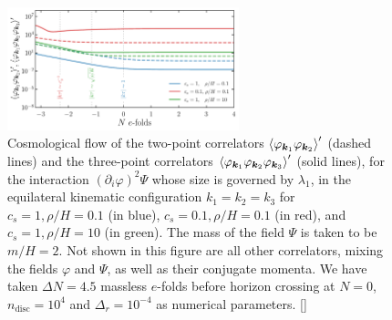\documentclass[11pt]{article}
\numberwithin{equation}{section} %
\begin{document}
\begin{figure}[h!]
  \centering
  \includegraphics[width=0.6\textwidth]{Figures/PhiPsi_DifferentHorizons.pdf}
  \vspace*{0.2cm}
  \caption{Cosmological flow of the two-point correlators $\braket{\varphi_{\bm{k}_1} \varphi_{\bm{k}_2}}'$ (dashed lines) and the three-point correlators $\braket{\varphi_{\bm{k}_1} \varphi_{\bm{k}_2} \varphi_{\bm{k}_3}}'$ (solid lines), for the interaction $(\partial_i \varphi)^2\Psi$ whose size is governed by $\lambda_1$, in the equilateral kinematic configuration $k_1=k_2=k_3$ for $c_s=1, \rho/H=0.1$ (in \textcolor{pyblue}{blue}), $c_s=0.1, \rho/H=0.1$ (in \textcolor{pyred}{red}), and $c_s=1, \rho/H=10$ (in \textcolor{pygreen}{green}). The mass of the field $\Psi$ is taken to be $m/H=2$. Not shown in this figure are all other correlators, mixing the fields $\varphi$ and $\Psi$, as well as their conjugate momenta. We have taken $\Delta N=4.5$ massless $e$-folds before horizon crossing at $N=0$, $n_{\text{disc}} = 10^4$ and $\Delta_r = 10^{-4}$ as numerical parameters. [\href{https://github.com/deniswerth/CosmoFlow/blob/main/CosmoFlow/PhiPsi/TimeEvolution.ipynb}{\faGithub}]}
  \label{fig: PhiPsi different horizons}
\end{figure}
\end{document}
